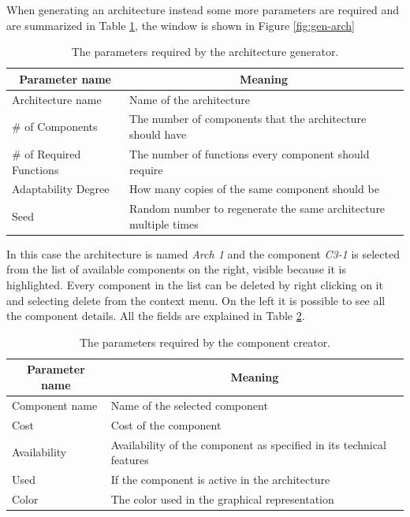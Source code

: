 When generating an architecture instead some more parameters are required and are summarized in Table \ref{tab:gen-parameters}, the window is shown in Figure \ref{fig:gen-arch}

\begin{table}[ht!b]
	\centering
	\begin{tabular}{|l|l|}
		\hline
		\multicolumn{1}{|c|}{Parameter name} & \multicolumn{1}{c|}{Meaning} \\
		\hline 
		Architecture name & Name of the architecture \\
		\hline
		\# of Components & The number of components that the architecture should have \\
		\hline
		\# of Required Functions & The number of functions every component should require \\
		\hline
		Adaptability Degree & How many copies of the same component should be \\
		\hline
		Seed & Random number to regenerate the same architecture multiple times \\
		\hline
		
	\end{tabular} 
	\caption[Generator parameters]{The parameters required by the architecture generator.}
	\label{tab:gen-parameters}
\end{table}

In this case the architecture is named \emph{Arch 1} and the component \emph{C3-1} is selected from the list of available components on the right, visible because it is highlighted. Every component in the list can be deleted by right clicking on it and selecting delete from the context menu. On the left it is possible to see all the component details. All the fields are explained in Table \ref{tab:comp-details}.

\begin{table}[ht!b]
	\centering
	\begin{tabular}{|l|l|}
		\hline
		\multicolumn{1}{|c|}{Parameter name} & \multicolumn{1}{c|}{Meaning} \\
		\hline 
		Component name & Name of the selected component \\
		\hline
		Cost & Cost of the component \\
		\hline
		Availability & Availability of the component as specified in its technical features\\
		\hline
		Used & If the component is active in the architecture \\
		\hline
		Color & The color used in the graphical representation \\
		\hline
		
	\end{tabular} 
	\caption[Component parameters]{The parameters required by the component creator.}
	\label{tab:comp-details}
\end{table}

